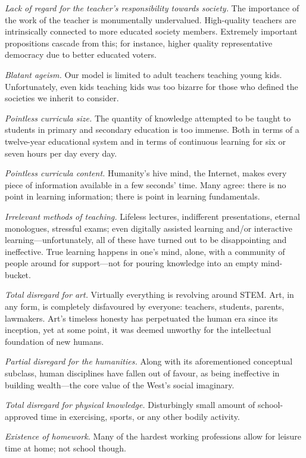 \emph{Lack of regard for the teacher's responsibility towards society.} The importance of the work of the teacher is monumentally undervalued. High-quality teachers are intrinsically connected to more educated society members. Extremely important propositions cascade from this; for instance, higher quality representative democracy due to better educated voters.

\emph{Blatant ageism.} Our model is limited to adult teachers teaching young kids. Unfortunately, even kids teaching kids was too bizarre for those who defined the societies we inherit to consider.

\emph{Pointless curricula size.} The quantity of knowledge attempted to be taught to students in primary and secondary education is too immense. Both in terms of a twelve-year educational system and in terms of continuous learning for six or seven hours per day every day.

\emph{Pointless curricula content.} Humanity’s hive mind, the Internet, makes every piece of information available in a few seconds’ time. Many agree: there is no point in learning information; there is point in learning fundamentals.

\emph{Irrelevant methods of teaching.} Lifeless lectures, indifferent presentations, eternal monologues, stressful exams; even digitally assisted learning and/or interactive learning—unfortunately, all of these have turned out to be disappointing and ineffective. True learning happens in one’s mind, alone, with a community of people around for support—not for pouring knowledge into an empty mind-bucket.

\emph{Total disregard for art.} Virtually everything is revolving around STEM. Art, in any form, is completely disfavoured by everyone: teachers, students, parents, lawmakers. Art’s timeless honesty has perpetuated the human era since its inception, yet at some point, it was deemed unworthy for the intellectual foundation of new humans.

\emph{Partial disregard for the humanities.} Along with its aforementioned conceptual subclass, human disciplines have fallen out of favour, as being ineffective in building wealth—the core value of the West’s social imaginary.

\emph{Total disregard for physical knowledge.} Disturbingly small amount of school-approved time in exercising, sports, or any other bodily activity.

\emph{Existence of homework.} Many of the hardest working professions allow for leisure time at home; not school though.

